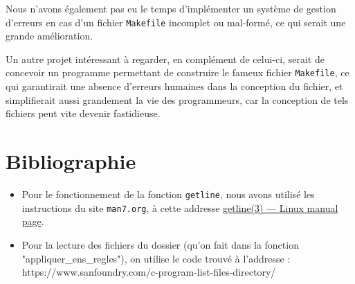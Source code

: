 \documentclass{article}
\begin{document}
Nous n’avons également pas eu le temps d’implémenter un système de gestion d’erreurs en cas d’un fichier \texttt{Makefile} incomplet ou mal-formé, ce qui serait une grande amélioration.

Un autre projet intéressant à regarder, en complément de celui-ci, serait de concevoir un programme permettant de construire le fameux fichier \texttt{Makefile}, ce qui garantirait une absence d’erreurs humaines dans la conception du fichier, et simplifierait aussi grandement la vie des programmeurs, car la conception de tels fichiers peut vite devenir fastidieuse.

\section{Bibliographie}

\begin{itemize}

	\item Pour le fonctionnement de la fonction \texttt{getline}, nous avons utilisé les instructions du site \texttt{man7.org}, à cette addresse \href{https://www.man7.org/linux/man-pages/man3/getline.3.html}{getline(3) — Linux manual page}.

	\item Pour la lecture des fichiers du dossier (qu’on fait dans la fonction "appliquer\_ens\_regles"), on utilise le code trouvé à l’addresse : https://www.sanfoundry.com/c-program-list-files-directory/

\end{itemize}
\end{document}
